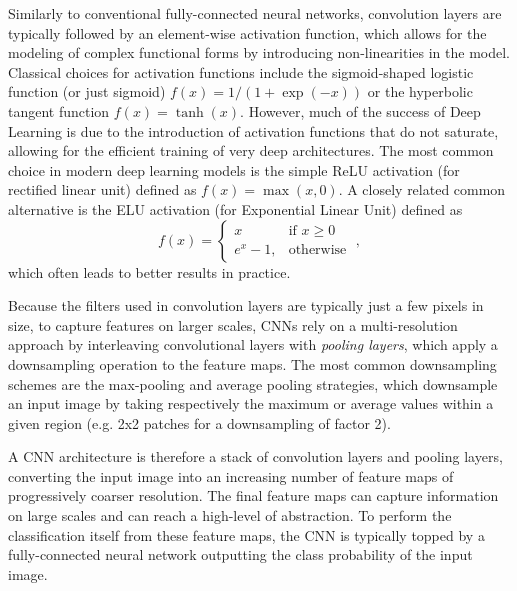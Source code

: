 \documentclass[useAMS,usenatbib]{mnras}
\begin{document}
Similarly to conventional fully-connected neural networks, convolution layers are typically followed  by an element-wise activation function, which allows for the modeling of complex functional forms  by introducing non-linearities in the model.  Classical choices  for  activation functions  include the sigmoid-shaped logistic  function (or just sigmoid) $f(x) = 1/ (1  + \exp(-x))$ or the hyperbolic tangent function $f(x) = \tanh(x)$. However, much of the success of Deep Learning is due to the  introduction of activation functions that do not saturate, allowing for the  efficient training  of very deep architectures. The most common choice in modern deep learning models  is the simple ReLU activation (for rectified linear unit) \citep{Nair2010} defined as $f(x) = \max(x, 0 )$. A closely related  common alternative is the ELU activation (for Exponential Linear Unit) \citep{2015arXiv151107289C} defined as 
\begin{equation}
	f(x ) = \begin{cases}
    x & \text{if } x\geq 0\\
    e^{x } - 1,              & \text{otherwise}
\end{cases}\;,
\end{equation}
which often leads to better results in practice.

Because the filters used in convolution layers are  typically  just a few pixels in size, to capture features on larger scales, CNNs rely on a multi-resolution approach by interleaving convolutional layers with \textit{pooling layers}, which apply a downsampling operation to the feature maps. The most common downsampling schemes are the max-pooling and average pooling strategies, which downsample an input image by taking respectively the maximum or average values within a given region (e.g. 2x2 patches for a downsampling of factor 2).

A CNN architecture is therefore a stack of convolution layers and pooling layers, converting the input image into an increasing number of feature maps of progressively coarser resolution. The final feature maps can capture information on large scales and can reach a high-level of abstraction. To perform the classification itself from these feature maps, the CNN is typically topped by a fully-connected neural network outputting the class probability of the input image.
\end{document}
